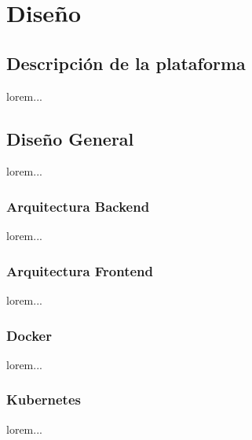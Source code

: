 
\chapter{Diseño}

  \section{Descripción de la plataforma}

lorem...

  \section{Diseño General}

lorem...

  \subsection{Arquitectura Backend}

lorem...


  \subsection{Arquitectura Frontend}

lorem...


  \subsection{Docker}

lorem...

  \subsection{Kubernetes}

lorem...